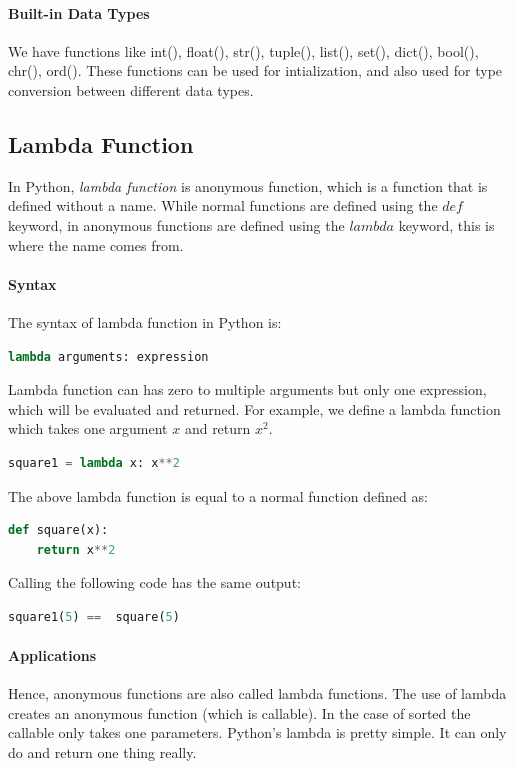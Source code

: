 \documentclass[../main.tex]{subfiles}
\begin{document}
\paragraph{Built-in Data Types}
We have functions like int(), float(), str(), tuple(), list(), set(), dict(), bool(), chr(), ord(). These functions can be used for intialization, and also used for type conversion between different data types. 

\subsection{Lambda Function}
In Python, \textit{lambda function} is anonymous function, which is a function that is defined without a name. While normal functions are defined using the $def$ keyword, in anonymous functions are defined using the $lambda$ keyword, this is where the name comes from.

\paragraph{Syntax} The syntax of lambda function in Python is:
\begin{lstlisting}[language=Python]
lambda arguments: expression
\end{lstlisting}
Lambda function can has zero to multiple arguments but only one expression, which will be evaluated and returned.  For example, we define a lambda function which takes one argument $x$ and return $x^2$.
\begin{lstlisting}[language=Python]
square1 = lambda x: x**2
\end{lstlisting}

The above lambda function is equal to a normal function defined as:
\begin{lstlisting}[language=Python]
def square(x):
    return x**2
\end{lstlisting}
Calling the following code has the same output:
\begin{lstlisting}[language=Python]
square1(5) ==  square(5)
\end{lstlisting}

\paragraph{Applications} 

Hence, anonymous functions are also called lambda functions. The use of lambda creates an anonymous function (which is callable). In the case of sorted the callable only takes one parameters. Python's lambda is pretty simple. It can only do and return one thing really.
\end{document}
